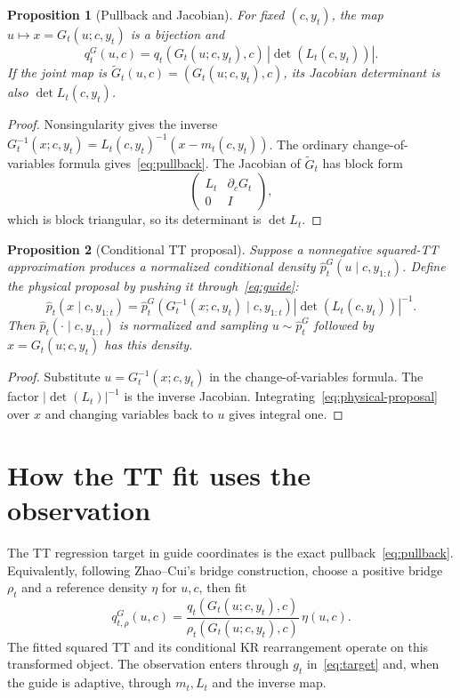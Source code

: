 \documentclass[11pt]{article}
\newtheorem{proposition}{Proposition}
\newcommand{\absdet}[1]{\left|\det\!\left(#1\right)\right|}
\begin{document}
\begin{proposition}[Pullback and Jacobian]
\label{prop:pullback}
For fixed $(c,y_t)$, the map $u\mapsto x=G_t(u;c,y_t)$ is a bijection and
\begin{equation}\label{eq:pullback}
 q_t^G(u,c)=q_t(G_t(u;c,y_t),c)\,\absdet{L_t(c,y_t)}.
\end{equation}
If the joint map is $\widetilde G_t(u,c)=(G_t(u;c,y_t),c)$, its Jacobian
determinant is also $\det L_t(c,y_t)$.
\end{proposition}
\begin{proof}
Nonsingularity gives the inverse
$G_t^{-1}(x;c,y_t)=L_t(c,y_t)^{-1}(x-m_t(c,y_t))$. The ordinary change-of-
variables formula gives~\eqref{eq:pullback}. The Jacobian of $\widetilde G_t$
has block form
\[
 \begin{pmatrix}L_t&\partial_cG_t\\0&I\end{pmatrix},
\]
which is block triangular, so its determinant is $\det L_t$.
\end{proof}

\begin{proposition}[Conditional TT proposal]
\label{prop:proposal}
Suppose a nonnegative squared-TT approximation produces a normalized
conditional density $\widehat p_t^G(u\mid c,y_{1:t})$. Define the physical
proposal by pushing it through~\eqref{eq:guide}:
\begin{equation}\label{eq:physical-proposal}
 \widehat p_t(x\mid c,y_{1:t})
 =\widehat p_t^G\!\left(G_t^{-1}(x;c,y_t)\mid c,y_{1:t}\right)
   \absdet{L_t(c,y_t)}^{-1}.
\end{equation}
Then $\widehat p_t(\cdot\mid c,y_{1:t})$ is normalized and sampling
$u\sim\widehat p_t^G$ followed by $x=G_t(u;c,y_t)$ has this density.
\end{proposition}
\begin{proof}
Substitute $u=G_t^{-1}(x;c,y_t)$ in the change-of-variables formula. The
factor $\absdet{L_t}^{-1}$ is the inverse Jacobian. Integrating~\eqref{eq:physical-proposal}
over $x$ and changing variables back to $u$ gives integral one.
\end{proof}

\section{How the TT fit uses the observation}
The TT regression target in guide coordinates is the exact pullback~\eqref{eq:pullback}.
Equivalently, following Zhao--Cui's bridge construction, choose a positive
bridge $\rho_t$ and a reference density $\eta$ for $u,c$, then fit
\begin{equation}\label{eq:ratio}
 q_{t,\rho}^G(u,c)=
 \frac{q_t(G_t(u;c,y_t),c)}{\rho_t(G_t(u;c,y_t),c)}\,\eta(u,c).
\end{equation}
The fitted squared TT and its conditional KR rearrangement operate on this
transformed object. The observation enters through $g_t$ in~\eqref{eq:target}
and, when the guide is adaptive, through $m_t,L_t$ and the inverse map.
\end{document}
